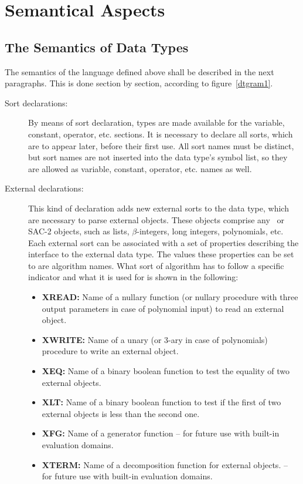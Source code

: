 \section{Semantical Aspects}

\subsection{The Semantics of Data Types}

The semantics of the language defined above shall be described in the next
paragraphs.
This is done section by section, according to figure~\ref{dtgram1}.

\begin{description}
\item[Sort declarations:]
By means of sort declaration, types are made available for the
variable, constant, operator, etc. sections. It is necessary to declare
all sorts, which are to appear later, before their first use.
All sort names must be distinct, but sort names are not inserted into the
data type's symbol list, so they are allowed as variable, constant, operator,
etc. names as well.

\item[External declarations:]
This kind of declaration adds new external sorts to the data type, which are
necessary to parse external objects. These objects comprise any \ALDES\ or 
SAC-2 objects, such as lists, $\beta$-integers, long integers, polynomials, etc.
Each external sort can be associated with a set of properties describing
the interface to the external data type. The values these properties can be set to
are algorithm names. What sort of algorithm has to follow a specific indicator
and what it is used for is shown in the following:
\begin{itemize}
\item{{\bf XREAD:}} Name of a nullary function (or nullary procedure with
three output parameters in case
of polynomial input) to read an external object.
\item{{\bf XWRITE:}} Name of a unary (or 3-ary in case of polynomials)
procedure to write an external object.
\item{{\bf XEQ:}} Name of a binary boolean function to test the equality
of two external objects.
\item{{\bf XLT:}} Name of a binary boolean function to test if the first
of two external objects is less than the second one.
\item{{\bf XFG:}} Name of a generator function -- for future use with
                  built-in evaluation domains.
\item{{\bf XTERM:}} Name of a decomposition function for external objects.
                 -- for future use with built-in evaluation domains.
\end{itemize}


\end{description}
